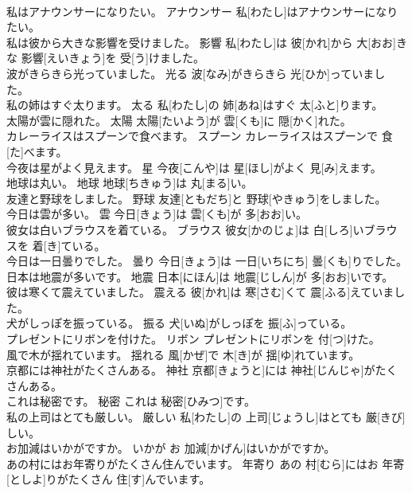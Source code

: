 \documentclass[8pt]{extreport}
\begin{document}
\begin{CJK}{UTF8}{min}
\\	私はアナウンサーになりたい。	アナウンサー	私[わたし]はアナウンサーになりたい。	
\\	私は彼から大きな影響を受けました。	影響	私[わたし]は 彼[かれ]から 大[おお]きな 影響[えいきょう]を 受[う]けました。	
\\	波がきらきら光っていました。	光る	波[なみ]がきらきら 光[ひか]っていました。	
\\	私の姉はすぐ太ります。	太る	私[わたし]の 姉[あね]はすぐ 太[ふと]ります。	
\\	太陽が雲に隠れた。	太陽	太陽[たいよう]が 雲[くも]に 隠[かく]れた。	
\\	カレーライスはスプーンで食べます。	スプーン	カレーライスはスプーンで 食[た]べます。	
\\	今夜は星がよく見えます。	星	今夜[こんや]は 星[ほし]がよく 見[み]えます。	
\\	地球は丸い。	地球	地球[ちきゅう]は 丸[まる]い。	
\\	友達と野球をしました。	野球	友達[ともだち]と 野球[やきゅう]をしました。	
\\	今日は雲が多い。	雲	今日[きょう]は 雲[くも]が 多[おお]い。	
\\	彼女は白いブラウスを着ている。	ブラウス	彼女[かのじょ]は 白[しろ]いブラウスを 着[き]ている。	
\\	今日は一日曇りでした。	曇り	今日[きょう]は 一日[いちにち] 曇[くも]りでした。	
\\	日本は地震が多いです。	地震	日本[にほん]は 地震[じしん]が 多[おお]いです。	
\\	彼は寒くて震えていました。	震える	彼[かれ]は 寒[さむ]くて 震[ふる]えていました。	
\\	犬がしっぽを振っている。	振る	犬[いぬ]がしっぽを 振[ふ]っている。	
\\	プレゼントにリボンを付けた。	リボン	プレゼントにリボンを 付[つ]けた。	
\\	風で木が揺れています。	揺れる	風[かぜ]で 木[き]が 揺[ゆ]れています。	
\\	京都には神社がたくさんある。	神社	京都[きょうと]には 神社[じんじゃ]がたくさんある。	
\\	これは秘密です。	秘密	これは 秘密[ひみつ]です。	
\\	私の上司はとても厳しい。	厳しい	私[わたし]の 上司[じょうし]はとても 厳[きび]しい。	
\\	お加減はいかがですか。	いかが	お 加減[かげん]はいかがですか。	
\\	あの村にはお年寄りがたくさん住んでいます。	年寄り	あの 村[むら]にはお 年寄[としよ]りがたくさん 住[す]んでいます。	

\end{CJK}
\end{document}
